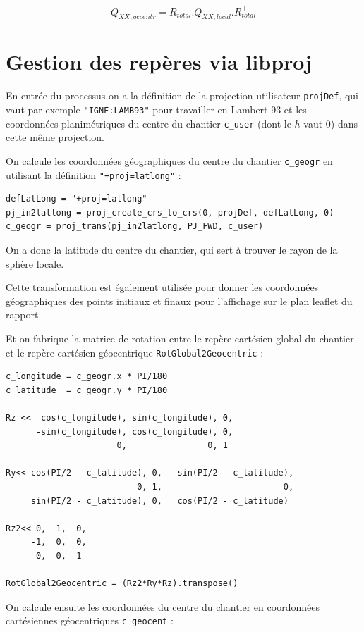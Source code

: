 \documentclass[french]{report}
\begin{document}
$$Q_{XX,gecentr} = R_{total} . Q_{XX,local} . R_{total}^{\top}$$

\section{Gestion des repères via libproj}

En entrée du processus on a la définition de la projection utilisateur \texttt{projDef}, qui vaut par exemple
\texttt{"IGNF:LAMB93"} pour travailler en Lambert 93 et les coordonnées planimétriques du centre du chantier \texttt{c\_user} (dont le $h$ vaut $0$) dans cette même projection.

On calcule les coordonnées géographiques du centre du chantier \texttt{c\_geogr} en utilisant la définition \texttt{"+proj=latlong"} :

\begin{verbatim}
defLatLong = "+proj=latlong"
pj_in2latlong = proj_create_crs_to_crs(0, projDef, defLatLong, 0)
c_geogr = proj_trans(pj_in2latlong, PJ_FWD, c_user)
\end{verbatim}

On a donc la latitude du centre du chantier, qui sert à trouver le rayon de la sphère locale.

Cette transformation est également utilisée pour donner les coordonnées géographiques des points initiaux et finaux pour l'affichage sur le plan leaflet du rapport.

Et on fabrique la matrice de rotation entre le repère cartésien global du chantier et le repère cartésien géocentrique \texttt{RotGlobal2Geocentric} :

\begin{verbatim}
c_longitude = c_geogr.x * PI/180
c_latitude  = c_geogr.y * PI/180

Rz <<  cos(c_longitude), sin(c_longitude), 0,
      -sin(c_longitude), cos(c_longitude), 0,
                      0,                0, 1

Ry<< cos(PI/2 - c_latitude), 0,  -sin(PI/2 - c_latitude),
                          0, 1,                        0,
     sin(PI/2 - c_latitude), 0,   cos(PI/2 - c_latitude)

Rz2<< 0,  1,  0,
     -1,  0,  0,
      0,  0,  1

RotGlobal2Geocentric = (Rz2*Ry*Rz).transpose()
\end{verbatim}

On calcule ensuite les coordonnées du centre du chantier en coordonnées cartésiennes géocentriques \texttt{c\_geocent} :
\end{document}
